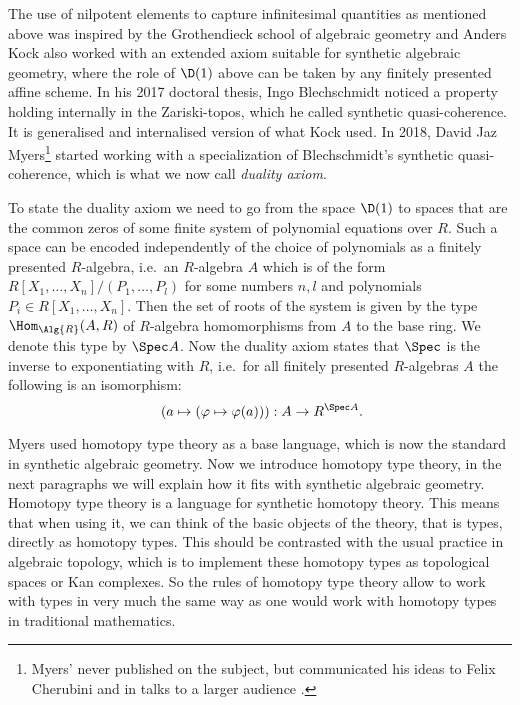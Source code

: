 The use of nilpotent elements to capture infinitesimal quantities as mentioned above was inspired by the Grothendieck school of algebraic geometry and Anders Kock also worked with an extended axiom \cite{Kock74,kockreyes} suitable for synthetic algebraic geometry, where the role of $\D(1)$ above can be taken by any finitely presented affine scheme. In his 2017 doctoral thesis, Ingo Blechschmidt noticed a property holding internally in the Zariski-topos, which he called synthetic quasi-coherence. It is generalised and internalised version of what Kock used. In 2018, David Jaz Myers\footnote{Myers' never published on the subject, but communicated his ideas to Felix Cherubini and in talks to a larger audience \cite{myers-talk1,myers-talk2}.} started working with a specialization of Blechschmidt's synthetic quasi-coherence, which is what we now call \emph{duality axiom}.

To state the duality axiom we need to go from the space $\D(1)$ to spaces that are the common zeros of some finite system of polynomial equations over $R$. Such a space can be encoded independently of the choice of polynomials as a finitely presented $R$-algebra, i.e.\ an $R$-algebra $A$ which is of the form $R[X_1,\dots,X_n]/(P_1,\dots,P_l)$ for some numbers $n,l$ and polynomials $P_i\in R[X_1,\dots,X_n]$.
Then the set of roots of the system is given by the type $\Hom_{\Alg{R}}(A,R)$ of $R$-algebra homomorphisms from $A$ to the base ring. We denote this type by $\Spec A$.
Now the duality axiom states that $\Spec$ is the inverse to exponentiating with $R$, i.e.\ for all 
finitely presented $R$-algebras $A$ the following is an isomorphism:
\[ (a\mapsto (\varphi\mapsto \varphi(a))) : A\to R^{\Spec A}\rlap{.}\]

Myers used homotopy type theory as a base language, which is now the standard in synthetic algebraic geometry. Now we introduce homotopy type theory, in the next paragraphs we will explain how it fits with synthetic algebraic geometry. Homotopy type theory is a language for synthetic homotopy theory.
This means that when using it, we can think of the basic objects of the theory, that is types, directly as homotopy types. This should be contrasted with the usual practice in algebraic topology, which is to implement these homotopy types as topological spaces or Kan complexes.
So the rules of homotopy type theory allow to work with types in very much the same way as one would work with homotopy types in traditional mathematics. %


